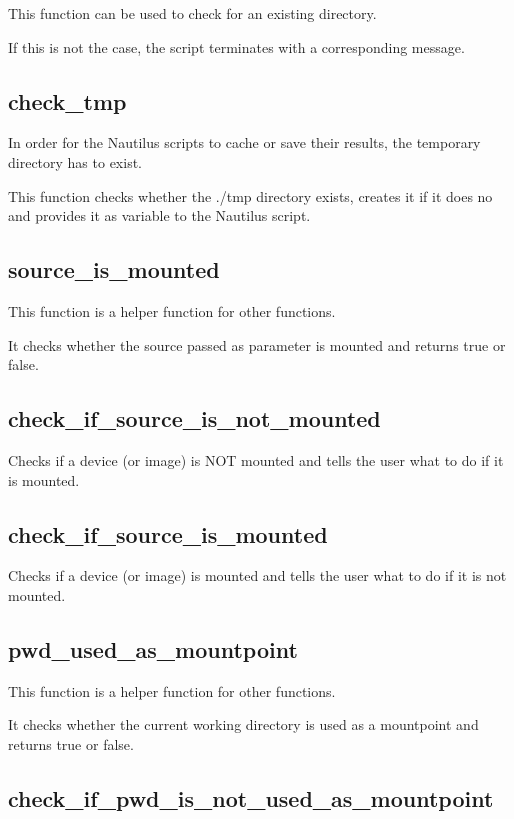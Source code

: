 This function can be used to check for an existing directory.

If this is not the case, the script terminates with a corresponding message.

\subsection{check\_tmp}

In order for the Nautilus scripts to cache or save their results, the temporary directory has to  exist.

This function checks whether the ./tmp directory exists, creates it if it does no and provides it as variable to the Nautilus script.

\subsection{source\_is\_mounted}

This function is a helper function for other functions.

It checks whether the source passed as parameter is mounted and returns true or false.

\subsection{check\_if\_source\_is\_not\_mounted}

Checks if a device (or image) is NOT mounted and tells the user what to do if it is mounted.

\subsection{check\_if\_source\_is\_mounted}

Checks if a device (or image) is mounted and tells the user what to do if it is not mounted.

\subsection{pwd\_used\_as\_mountpoint}

This function is a helper function for other functions.

It checks whether the current working directory is used as a mountpoint and returns true or false.

\subsection{check\_if\_pwd\_is\_not\_used\_as\_mountpoint}

